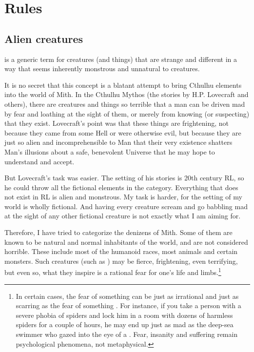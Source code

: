 \section{Rules}

\subsection{Alien creatures}

 is a generic term for creatures (and things) that are strange and different in a way that seems inherently monstrous and unnatural to  creatures. 

It is no secret that this concept is a blatant attempt to bring Cthulhu elements into the world of Mith. In the Cthulhu Mythos (the stories by H.P. Lovecraft and others), there are creatures and things so terrible that a man can be driven mad by fear and loathing at the sight of them, or merely from knowing (or suspecting) that they exist. Lovecraft's point was that these things are frightening, not because they came from some Hell or were otherwise evil, but because they are just so alien and incomprehensible to Man that their very existence shatters Man's illusions about a safe, benevolent Universe that he may hope to understand and accept. 

But Lovecraft's task was easier. The setting of his stories is 20th century RL, so he could throw all the fictional elements in the  category. Everything that does not exist in RL is alien and monstrous. My task is harder, for the setting of my world is wholly fictional. And having every creature scream and go babbling mad at the sight of any other fictional creature is not exactly what I am aiming for. 

Therefore, I have tried to categorize the denizens of Mith. Some of them are known to be natural and normal inhabitants of the world, and are not considered horrible. These include most of the humanoid races, most animals and certain monsters. Such creatures (such as \dragons) may be fierce, frightening, even terrifying, but even so, what they inspire is a rational fear for one's life and limbs.\footnote{In certain cases, the fear of something  can be just as irrational and just as scarring as the fear of something . For instance, if you take a person with a severe phobia of spiders and lock him in a room with dozens of harmless spiders for a couple of hours, he may end up just as mad as the deep-sea swimmer who gazed into the eye of a \kraken. Fear, insanity and suffering remain psychological phenomena, not metaphysical.} 

